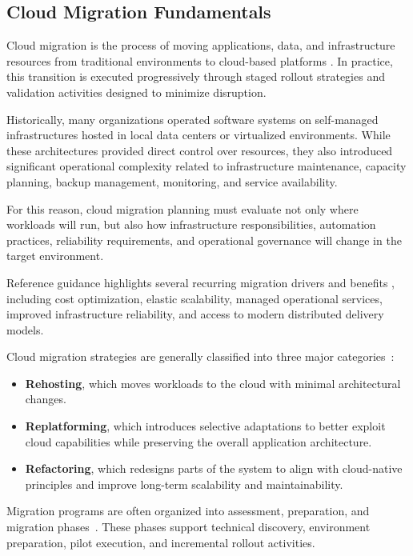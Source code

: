 \subsection{Cloud Migration Fundamentals}
Cloud migration is the process of moving applications, data, and infrastructure resources from traditional environments to cloud-based platforms \cite{awsCloudMigrationOverview}. In practice, this transition is executed progressively through staged rollout strategies and validation activities designed to minimize disruption.

Historically, many organizations operated software systems on self-managed infrastructures hosted in local data centers or virtualized environments. While these architectures provided direct control over resources, they also introduced significant operational complexity related to infrastructure maintenance, capacity planning, backup management, monitoring, and service availability.

For this reason, cloud migration planning must evaluate not only where workloads will run, but also how infrastructure responsibilities, automation practices, reliability requirements, and operational governance will change in the target environment.

Reference guidance highlights several recurring migration drivers and benefits \cite{awsCloudMigrationOverview}, including cost optimization, elastic scalability, managed operational services, improved infrastructure reliability, and access to modern distributed delivery models.

Cloud migration strategies are generally classified into three major categories~\cite{awsCloudMigrationOverview}:

\begin{itemize}
    \item \textbf{Rehosting}, which moves workloads to the cloud with minimal architectural changes.

    \item \textbf{Replatforming}, which introduces selective adaptations to better exploit cloud capabilities while preserving the overall application architecture.

    \item \textbf{Refactoring}, which redesigns parts of the system to align with cloud-native principles and improve long-term scalability and maintainability.
\end{itemize}

Migration programs are often organized into assessment, preparation, and migration phases~\cite{awsCloudMigrationOverview}. These phases support technical discovery, environment preparation, pilot execution, and incremental rollout activities.

